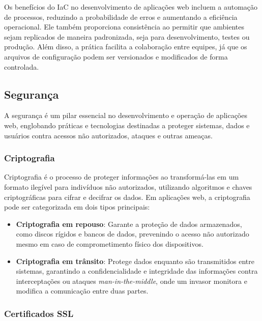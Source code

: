 Os benefícios do IaC no desenvolvimento de aplicações web incluem a automação de processos, reduzindo a probabilidade de erros e aumentando a eficiência operacional. Ele também proporciona consistência ao permitir que ambientes sejam replicados de maneira padronizada, seja para desenvolvimento, testes ou produção. Além disso, a prática facilita a colaboração entre equipes, já que os arquivos de configuração podem ser versionados e modificados de forma controlada. 

\subsection{Segurança}

A segurança é um pilar essencial no desenvolvimento e operação de aplicações web, englobando práticas e tecnologias destinadas a proteger sistemas, dados e usuários contra acessos não autorizados, ataques e outras ameaças.


\subsubsection{Criptografia}


Criptografia é o processo de proteger informações ao transformá-las em um formato ilegível para indivíduos não autorizados, utilizando algoritmos e chaves criptográficas para cifrar e decifrar os dados. Em aplicações web, a criptografia pode ser categorizada em dois tipos principais:

\begin{itemize}
    \item \textbf{Criptografia em repouso}: Garante a proteção de dados armazenados, como discos rígidos e bancos de dados, prevenindo o acesso não autorizado mesmo em caso de comprometimento físico dos dispositivos.
    \item \textbf{Criptografia em trânsito}: Protege dados enquanto são transmitidos entre sistemas, garantindo a confidencialidade e integridade das informações contra interceptações ou ataques \emph{man-in-the-middle}, onde um invasor monitora e modifica a comunicação entre duas partes.
\end{itemize}

\subsubsection{Certificados SSL}


